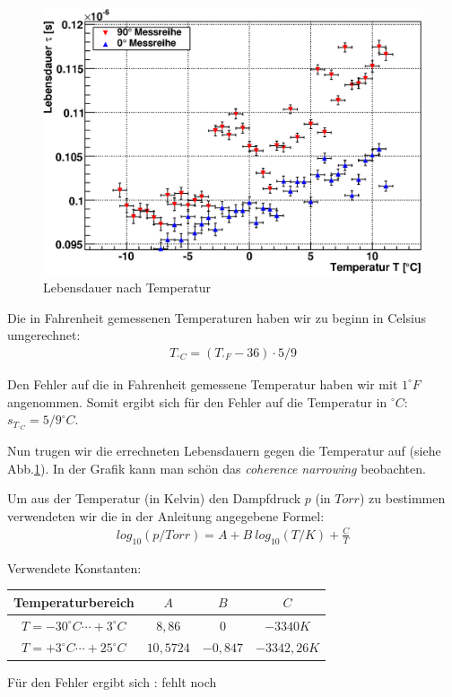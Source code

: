 \documentclass[12pt]{article}
\begin{document}
\begin{figure}[H]  
\centering
\includegraphics[width=0.9\linewidth]{pictures/lebensdauer_temp.eps}
\caption{Lebensdauer nach Temperatur}
\label{leben_temp}
\end{figure}

Die in Fahrenheit gemessenen Temperaturen haben wir zu beginn in Celsius umgerechnet:
\begin{align}
 T_{^\circ C} = (T_{^\circ F} - 36) \cdot 5 / 9
\end{align}

Den Fehler auf die in Fahrenheit gemessene Temperatur haben wir mit $1^\circ F$ angenommen. Somit ergibt sich für den Fehler auf die Temperatur in
$^\circ C$: $s_{T_{^\circ C}} = 5 / 9 ^\circ C$.

Nun trugen wir die errechneten Lebensdauern gegen die Temperatur auf (siehe Abb.\ref{leben_temp}). In der Grafik kann man schön das 
\textit{coherence narrowing} beobachten.

Um aus der Temperatur (in Kelvin) den Dampfdruck $p$ (in $Torr$) zu bestimmen verwendeten wir die in der Anleitung angegebene Formel:
\begin{align}
 log_{10}(p/Torr) = A + B ~ log_{10}(T/K) + \frac{C}{T}
\end{align}

\begin{center}
Verwendete Konstanten: \\
\vspace{20pt}
\begin{tabular}{|c|c|c|c|}
 \hline
 Temperaturbereich&$A$&$B$&$C$\\
 \hline
 $T = -30^\circ C \cdots +3^\circ C$&$8,86$&$0$&$-3340K$ \\
 $T = +3^\circ C \cdots +25^\circ C$&$10,5724$&$-0,847$&$-3342,26K$ \\
 \hline
\end{tabular}

 \vspace{20pt}
\end{center}
Für den Fehler ergibt sich : fehlt noch
\end{document}
